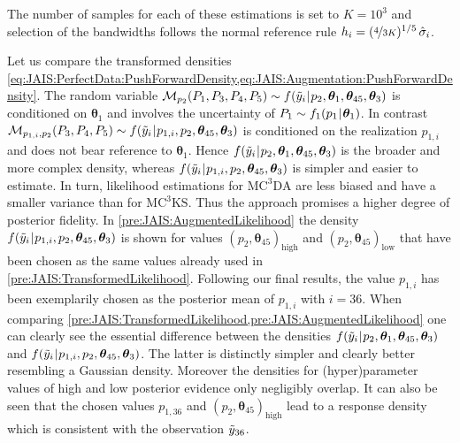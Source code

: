 The number of samples for each of these estimations is set to \(K=10^3\) and selection of the bandwidths follows the normal reference rule \(h_i = (\nicefrac{4}{3K})^{1/5} \, \hat{\sigma}_i\).
\par %
Let us compare the transformed densities \cref{eq:JAIS:PerfectData:PushForwardDensity,eq:JAIS:Augmentation:PushForwardDensity}.
The random variable \(\mathcal{M}_{p_2} (P_1,P_3,P_4,P_5) \sim f(\tilde{y}_i {\:\!}|{\:\!} p_2,\bm{\theta}_1,\bm{\theta}_{45},\bm{\theta}_3)\)
is conditioned on \(\bm{\theta}_1\) and involves the uncertainty of \(P_1 \sim f_1(p_{1} {\:\!}|{\:\!} \bm{\theta}_1)\).
In contrast \(\mathcal{M}_{p_{1,i},p_2} (P_3, \allowbreak P_4,P_5) \sim f(\tilde{y}_i {\:\!}|{\:\!} p_{1,i},p_2,\bm{\theta}_{45},\bm{\theta}_3)\)
is conditioned on the realization \(p_{1,i}\) and does not bear reference to \(\bm{\theta}_1\).
Hence \(f(\tilde{y}_i {\:\!}|{\:\!} p_2,\bm{\theta}_1,\bm{\theta}_{45},\bm{\theta}_3)\) is the broader and more complex density,
whereas \(f(\tilde{y}_i {\:\!}|{\:\!} p_{1,i},p_2,\bm{\theta}_{45},\bm{\theta}_3)\) is simpler and easier to estimate.
In turn, likelihood estimations for \(\text{MC}^3\text{DA}\) are less biased and have a smaller variance than for \(\text{MC}^3\text{KS}\).
Thus the approach promises a higher degree of posterior fidelity.
In \cref{pre:JAIS:AugmentedLikelihood} the density \(f(\tilde{y}_i {\:\!}|{\:\!} p_{1,i},p_2,\bm{\theta}_{45},\bm{\theta}_3)\) is shown for values
\((p_2,\bm{\theta}_{45})_{\mathrm{high}}\) and \((p_2,\bm{\theta}_{45})_{\mathrm{low}}\) that have been chosen as the same values already used in \cref{pre:JAIS:TransformedLikelihood}.
Following our final results, the value \(p_{1,i}\) has been exemplarily chosen as the posterior mean of \(p_{1,i}\) with \(i=36\).
When comparing \cref{pre:JAIS:TransformedLikelihood,pre:JAIS:AugmentedLikelihood} one can clearly see the essential difference between the densities
\(f(\tilde{y}_i {\:\!}|{\:\!} p_2,\bm{\theta}_1,\bm{\theta}_{45},\bm{\theta}_3)\) and \(f(\tilde{y}_i {\:\!}|{\:\!} p_{1,i},p_2,\bm{\theta}_{45},\bm{\theta}_3)\).
The latter is distinctly simpler and clearly better resembling a Gaussian density.
Moreover the densities for (hyper)parameter values of high and low posterior evidence only negligibly overlap.
It can also be seen that the chosen values \(p_{1,36}\) and \((p_2,\bm{\theta}_{45})_{\mathrm{high}}\) lead to a response density which is consistent with the observation \(\tilde{y}_{36}\).
